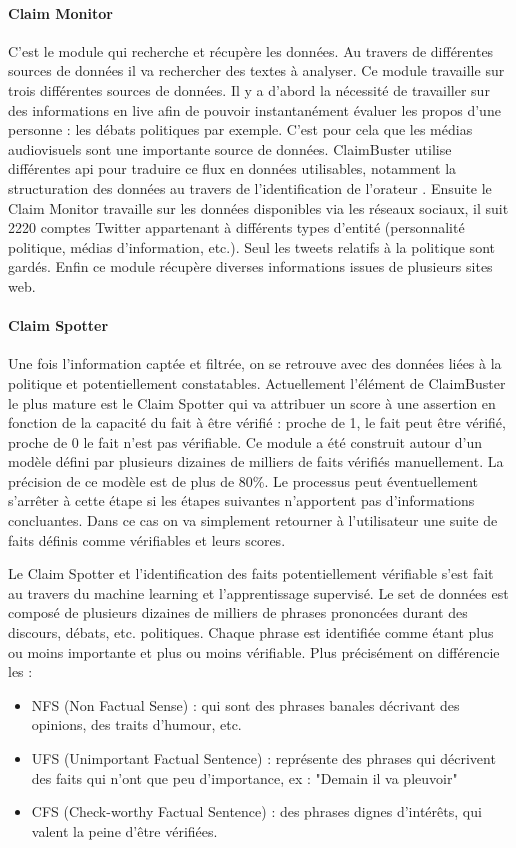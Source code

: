 \paragraph{Claim Monitor}

C'est le module qui recherche et récupère les données. Au travers de différentes sources de données il va rechercher des textes à analyser. Ce module travaille sur trois différentes sources de données. Il y a d'abord la nécessité de travailler sur des informations en live afin de pouvoir instantanément évaluer les propos d'une personne : les débats politiques par exemple. C'est pour cela que les médias audiovisuels sont une importante source de données. ClaimBuster utilise différentes api pour traduire ce flux en données utilisables, notamment la structuration des données au travers de l'identification de l'orateur \cite{joseph2015speaker}. Ensuite le Claim Monitor travaille sur les données disponibles via les réseaux sociaux, il suit 2220 comptes Twitter appartenant à différents types d'entité (personnalité politique, médias d'information, etc.). Seul les tweets relatifs à la politique sont gardés. Enfin ce module récupère diverses informations issues de plusieurs sites web.

\paragraph{Claim Spotter}

Une fois l'information captée et filtrée, on se retrouve avec des données liées à la politique et potentiellement constatables. Actuellement l'élément de ClaimBuster le plus mature est le Claim Spotter qui va attribuer un score à une assertion en fonction de la capacité du fait à être vérifié : proche de 1, le fait peut être vérifié, proche de 0 le fait n'est pas vérifiable. Ce module a été construit autour d'un modèle défini par plusieurs dizaines de milliers de faits vérifiés manuellement. La précision de ce modèle est de plus de 80\%. Le processus peut éventuellement s'arrêter à cette étape si les étapes suivantes n'apportent pas d'informations concluantes. Dans ce cas on va simplement retourner à l'utilisateur une suite de faits définis comme vérifiables et leurs scores.

Le Claim Spotter et l'identification des faits potentiellement vérifiable s'est fait au travers du machine learning et l'apprentissage supervisé. Le set de données est composé de plusieurs dizaines de milliers de phrases prononcées durant des discours, débats, etc. politiques. Chaque phrase est identifiée comme étant plus ou moins importante et plus ou moins vérifiable. Plus précisément on différencie les : 
\begin{itemize}
    \item NFS (Non Factual Sense) : qui sont des phrases banales décrivant des opinions, des traits d'humour, etc. 
    \item UFS (Unimportant Factual Sentence) : représente des phrases qui décrivent des faits qui n'ont que peu d'importance, ex : "Demain il va pleuvoir"
    \item CFS (Check-worthy Factual Sentence) : des phrases dignes d'intérêts, qui valent la peine d'être vérifiées. 
\end{itemize}


